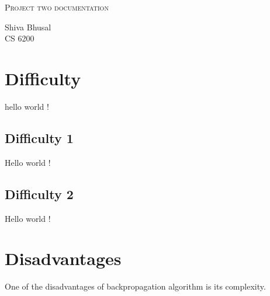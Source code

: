 \documentclass[letterpaper]{article}
\newcommand{\reporttitle}{Project two documentation}
\newcommand{\name}{Shiva Bhusal}
\newcommand{\course}{CS 6200}
\begin{document}
\begin{center}{\huge \scshape \reporttitle}\end{center}
\begin{center}\vspace{0.2em} {\Large \name\\}
  {\course}\end{center}
  
  
  \section{Difficulty}
  hello world !
   
  \subsection{Difficulty 1}
  Hello world ! 
  
  
  
  \subsection{Difficulty 2}
  Hello world !
 
 \section {Disadvantages}
 
 One of the disadvantages of backpropagation algorithm is its complexity. 
 
\end{document}
